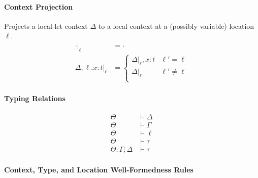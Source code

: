 \documentclass{article}
\theoremstyle{definition}
\newcommand\proj[2]{\ensuremath{\left.#1\right|_{#2}}}
\begin{document}
\paragraph{Context Projection}
Projects a local-let context $\Delta$ to a local context at a (possibly variable) location $\ell$.
\begin{align*}
	\proj{\cdot}{\ell} &= \cdot \\
	\proj{\Delta, \ell.x : t}{\ell} &=
		\begin{cases} 
      		\proj{\Delta}{\ell}, x : t & \ell' = \ell \\
      		\proj{\Delta}{\ell} & \ell' \neq \ell \\
   		\end{cases}
\end{align*}

\paragraph{Typing Relations}
\begin{align*}
	\Theta &\vdash \Delta \tag{Local-Let Context Well-Formedness}\\
	\Theta &\vdash \Gamma \tag{Choreography Context Well-Formedness}\\
	\Theta &\vdash \ell \tag{Location Well-Formedness}\\
	\Theta &\vdash \tau \tag{Choreography Type Well-Formedness}\\
	\Theta;\Gamma;\Delta &\vdash \tau \tag{Choreography Typing Relation}
\end{align*}

\paragraph{Context, Type, and Location Well-Formedness Rules}
\end{document}
